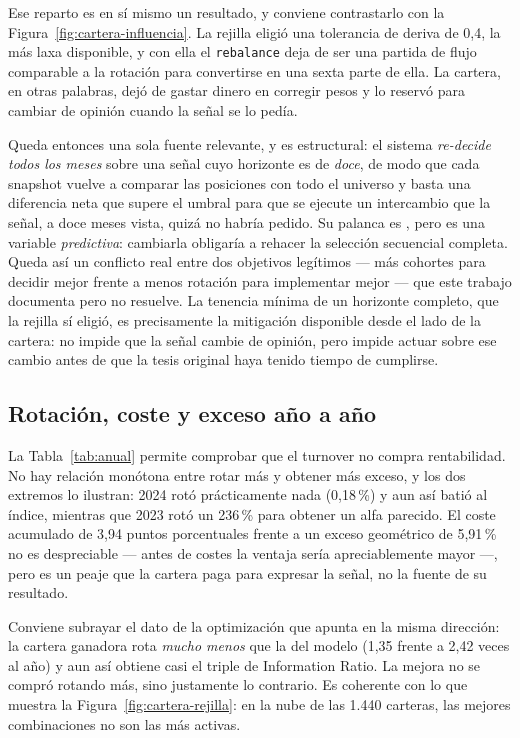Ese reparto es en sí mismo un resultado, y conviene contrastarlo con la Figura~\ref{fig:cartera-influencia}.
La rejilla eligió una tolerancia de deriva de 0,4, la más laxa disponible, y con ella el
\texttt{rebalance} deja de ser una partida de flujo comparable a la rotación para convertirse en una
sexta parte de ella. La cartera, en otras palabras, dejó de gastar dinero en corregir pesos y lo
reservó para cambiar de opinión cuando la señal se lo pedía.

Queda entonces una sola fuente relevante, y es estructural: el sistema \emph{re-decide todos los
meses} sobre una señal cuyo horizonte es de \emph{doce}, de modo que cada snapshot vuelve a comparar
las posiciones con todo el universo y basta una diferencia neta que supere el umbral para que se
ejecute un intercambio que la señal, a doce meses vista, quizá no habría pedido. Su palanca es
, pero es una variable \emph{predictiva}: cambiarla obligaría a
rehacer la selección secuencial completa. Queda así un conflicto real entre dos objetivos legítimos
--- más cohortes para decidir mejor frente a menos rotación para implementar mejor --- que este
trabajo documenta pero no resuelve. La tenencia mínima de un horizonte completo, que la rejilla sí
eligió, es precisamente la mitigación disponible desde el lado de la cartera: no impide que la señal
cambie de opinión, pero impide actuar sobre ese cambio antes de que la tesis original haya tenido
tiempo de cumplirse.

\subsection*{Rotación, coste y exceso año a año}

La Tabla~\ref{tab:anual} permite comprobar que el turnover no compra rentabilidad. No hay relación
monótona entre rotar más y obtener más exceso, y los dos extremos lo ilustran: 2024 rotó
prácticamente nada (0,18\,\%) y aun así batió al índice, mientras que 2023 rotó un 236\,\% para
obtener un alfa parecido. El coste acumulado de 3,94 puntos porcentuales frente a un exceso
geométrico de 5,91\,\% no es despreciable --- antes de costes la ventaja sería apreciablemente
mayor ---, pero es un peaje que la cartera paga para expresar la señal, no la fuente de su
resultado.

Conviene subrayar el dato de la optimización que apunta en la misma dirección: la cartera ganadora
rota \emph{mucho menos} que la del modelo (1,35 frente a 2,42 veces al año) y aun así obtiene casi
el triple de Information Ratio. La mejora no se compró rotando más, sino justamente lo contrario. Es
coherente con lo que muestra la Figura~\ref{fig:cartera-rejilla}: en la nube de las 1.440 carteras,
las mejores combinaciones no son las más activas.

